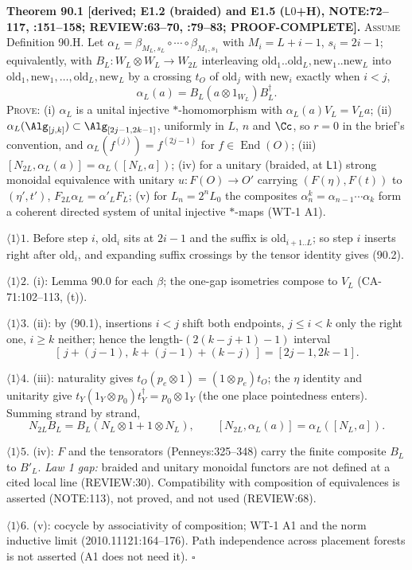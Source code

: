\textbf{Theorem 90.1 [derived; E1.2 (braided) and E1.5 (\(\mathsf L0\)+H), NOTE:72--117, :151--158; REVIEW:63--70,
:79--83; PROOF-COMPLETE].}  \textsc{Assume} Definition 90.H.  Let \(\alpha_L=\beta_{M_L,s_L}\circ\cdots\circ\beta_{M_1,s_1}\)
with \(M_i=L+i-1\), \(s_i=2i-1\); equivalently, with \(B_L:W_L\otimes W_L\to W_{2L}\) interleaving
\(\mathrm{old}_1..\mathrm{old}_L,\mathrm{new}_1..\mathrm{new}_L\) into \(\mathrm{old}_1,\mathrm{new}_1,\dots,\mathrm{old}_L,\mathrm{new}_L\)
by a crossing \(t_O\) of \(\mathrm{old}_j\) with \(\mathrm{new}_i\) exactly when \(i<j\),
\[
 \alpha_L(a)=B_L(a\otimes1_{W_L})B_L^\dagger . \tag{90.2}
\]
\textsc{Prove}: (i) \(\alpha_L\) is a unital injective \(*\)-homomorphism with \(\alpha_L(a)V_L=V_La\);
(ii) \(\alpha_L(\Alg_{[j,k]})\subset\Alg_{[2j-1,2k-1]}\), uniformly in \(L\), \(n\) and \(\Cc\), so \(r=0\) in the brief's
convention, and \(\alpha_L(f^{(j)})=f^{(2j-1)}\) for \(f\in\operatorname{End}(O)\); (iii) \([N_{2L},\alpha_L(a)]=\alpha_L([N_L,a])\);
(iv) for a unitary (braided, at \(\mathsf L1\)) strong monoidal equivalence with unitary \(u:F(O)\to O'\) carrying
\((F(\eta),F(t))\) to \((\eta',t')\), \(F_{2L}\alpha_L=\alpha'_LF_L\); (v) for \(L_n=2^nL_0\) the composites
\(\alpha^k_n=\alpha_{n-1}\cdots\alpha_k\) form a coherent directed system of unital injective \(*\)-maps (WT-1 A1).
\par\(\langle1\rangle1\). Before step \(i\), \(\mathrm{old}_i\) sits at \(2i-1\) and the suffix is \(\mathrm{old}_{i+1..L}\); so
step \(i\) inserts right after \(\mathrm{old}_i\), and expanding suffix crossings by the tensor identity gives (90.2).
\par\(\langle1\rangle2\). (i): Lemma 90.0 for each \(\beta\); the one-gap isometries compose to \(V_L\) (CA-71:102--113, (t)).
\par\(\langle1\rangle3\). (ii): by (90.1), insertions \(i<j\) shift both endpoints, \(j\le i<k\) only the right one, \(i\ge k\)
neither; hence the length-\((2(k-j+1)-1)\) interval
\[
 [\,j+(j-1),\ k+(j-1)+(k-j)\,]=[2j-1,2k-1]. \tag{90.3}
\]
\par\(\langle1\rangle4\). (iii): naturality gives \(t_O(p_e\otimes1)=(1\otimes p_e)t_O\); the \(\eta\) identity and unitarity give
\(t_Y(1_Y\otimes p_0)t_Y^\dagger=p_0\otimes1_Y\) (the one place pointedness enters).  Summing strand by strand,
\[
 N_{2L}B_L=B_L(N_L\otimes1+1\otimes N_L),\qquad [N_{2L},\alpha_L(a)]=\alpha_L([N_L,a]). \tag{90.4}
\]
\par\(\langle1\rangle5\). (iv): \(F\) and the tensorators (Penneys:325--348) carry the finite composite \(B_L\) to \(B'_L\).
\emph{Law 1 gap:} braided and unitary monoidal functors are not defined at a cited local line (REVIEW:30).  Compatibility
with composition of equivalences is asserted (NOTE:113), not proved, and not used (REVIEW:68).
\par\(\langle1\rangle6\). (v): cocycle by associativity of composition; WT-1 A1 and the norm inductive limit
(2010.11121:164--176).  Path independence across placement forests is not asserted (A1 does not need it).  \(\square\)

